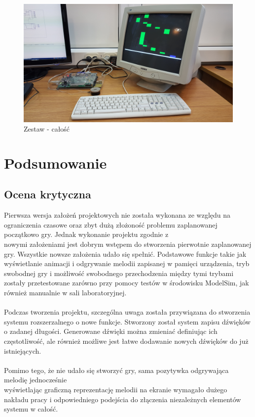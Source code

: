 \documentclass[a4paper]{report}
\begin{document}
		\begin{figure}[h!]
				\centering
				\includegraphics[width=1.0\textwidth]{zestaw_calosc.jpg}
				\caption{Zestaw - całość}
	\end{figure}	
		
	
\chapter{Podsumowanie}
	\section{Ocena krytyczna}
	Pierwsza wersja założeń projektowych nie została wykonana ze względu na ograniczenia czasowe oraz zbyt dużą złożoność problemu zaplanowanej początkowo gry. Jednak wykonanie projektu zgodnie z \\nowymi założeniami jest dobrym wstępem do stworzenia pierwotnie zaplanowanej gry. Wszystkie nowsze założenia udało się spełnić. Podstawowe funkcje takie jak wyświetlanie animacji i odgrywanie melodii zapisanej w pamięci urządzenia, tryb swobodnej gry i możliwość swobodnego przechodzenia między tymi trybami zostały przetestowane zarówno przy pomocy testów w środowisku ModelSim, jak również manualnie w sali laboratoryjnej.
\\\\ Podczas tworzenia projektu, szczególna uwaga została przywiązana do stworzenia systemu rozszerzalnego o nowe funkcje. Stworzony został system zapisu dźwięków o zadanej długości. Generowane dźwięki można zmieniać definiując ich częstotliwość, ale również możliwe jest łatwe dodawanie nowych dźwięków do już istniejących.
\\\\Pomimo tego, że nie udało się stworzyć gry, sama pozytywka odgrywająca melodię jednocześnie \\wyświetlając graficzną reprezentację melodii na ekranie wymagało dużego nakładu pracy i odpowiedniego podejścia do złączenia niezależnych elementów systemu w całość.
\end{document}
